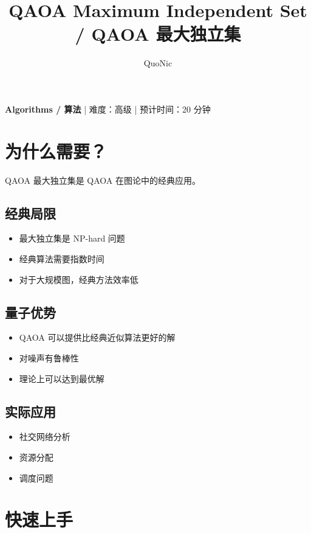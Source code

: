 \documentclass[12pt,a4paper]{article}
\title{QAOA Maximum Independent Set / QAOA 最大独立集}
\author{QuoNic}
\date{}
\begin{document}
\maketitle

\begin{center}
\textbf{Algorithms / 算法} | 难度：高级 | 预计时间：20 分钟
\end{center}

\tableofcontents
\newpage

\section{为什么需要？}

QAOA 最大独立集是 QAOA 在图论中的经典应用。

\subsection{经典局限}
\begin{itemize}
  \item 最大独立集是 NP-hard 问题
  \item 经典算法需要指数时间
  \item 对于大规模图，经典方法效率低
\end{itemize}

\subsection{量子优势}
\begin{itemize}
  \item QAOA 可以提供比经典近似算法更好的解
  \item 对噪声有鲁棒性
  \item 理论上可以达到最优解
\end{itemize}

\subsection{实际应用}
\begin{itemize}
  \item 社交网络分析
  \item 资源分配
  \item 调度问题
\end{itemize}

\section{快速上手}
\end{document}
